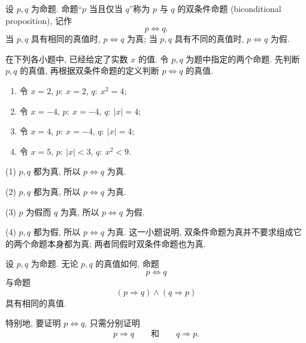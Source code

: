 \documentclass[usesamecnt, thmcnt=section, lang=cn, newtx, 10pt, scheme=chinese]{elegantbook}
\begin{document}
\begin{definition}[双条件命题]\label{def:biconditional}
设 $p,q$ 为命题. 命题``$p$ 当且仅当 $q$''称为 $p$ 与 $q$ 的{\color{blue}双条件命题 (biconditional proposition)}, 记作
\[
 p\Leftrightarrow q.
\]
当 $p,q$ 具有相同的真值时, $p\Leftrightarrow q$ 为真; 当 $p,q$ 具有不同的真值时, $p\Leftrightarrow q$ 为假.
\end{definition}

\begin{concept}
\label{con:logic-09}
在下列各小题中, 已经给定了实数 $x$ 的值. 令 $p,q$ 为题中指定的两个命题. 先判断 $p,q$ 的真值, 再根据双条件命题的定义判断 $p\Leftrightarrow q$ 的真值.
\begin{enumerate}[label=\rm(\arabic*)]
  \item 令 $x=2$, $p:\ x=2$, $q:\ x^2=4$;
  \item 令 $x=-4$, $p:\ x=-4$, $q:\ |x|=4$;
  \item 令 $x=4$, $p:\ x=-4$, $q:\ |x|=4$;
  \item 令 $x=5$, $p:\ |x|<3$, $q:\ x^2<9$.
\end{enumerate}
\end{concept}

\begin{solution}
(1) $p,q$ 都为真, 所以 $p\Leftrightarrow q$ 为真.

(2) $p,q$ 都为真, 所以 $p\Leftrightarrow q$ 为真.

(3) $p$ 为假而 $q$ 为真, 所以 $p\Leftrightarrow q$ 为假.

(4) $p,q$ 都为假, 所以 $p\Leftrightarrow q$ 为真. 这一小题说明, 双条件命题为真并不要求组成它的两个命题本身都为真; 两者同假时双条件命题也为真.
\end{solution}

\begin{theorem}\label{thm:biconditional-criterion}
设 $p,q$ 为命题. 无论 $p,q$ 的真值如何, 命题
\[
 p\Leftrightarrow q
\]
与命题
\[
 (p\Rightarrow q)\wedge(q\Rightarrow p)
\]
具有相同的真值.

特别地, 要证明 $p\Leftrightarrow q$, 只需分别证明
\[
 p\Rightarrow q
 \qquad\text{和}\qquad
 q\Rightarrow p.
\]
\end{theorem}
\end{document}

